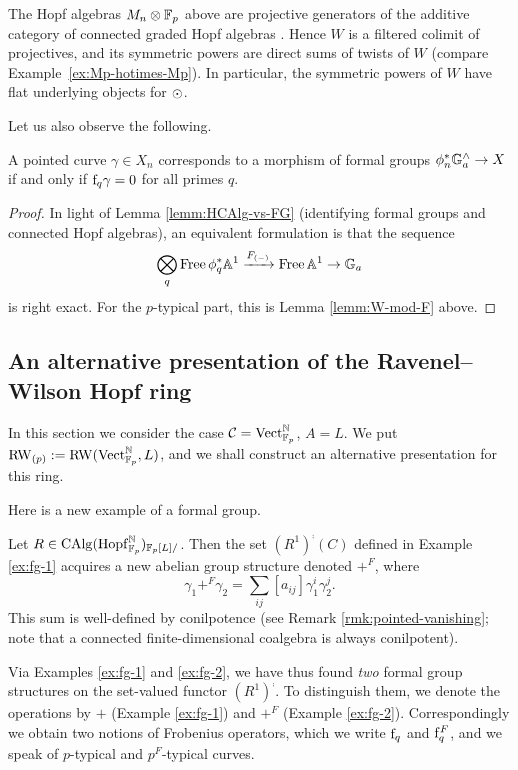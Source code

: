 \begin{remark}\label{app:rw-projective}
The Hopf algebras $M_n\otimes \mathbb{F}_p$ above are projective generators of the additive category of connected graded Hopf algebras \cite{goerss-dieudonne,MR281709}. Hence $W$ is a filtered colimit of projectives, and its symmetric powers are direct sums of twists of $W$ (compare Example~\ref{ex:Mp-hotimes-Mp}). In particular, the symmetric powers of $W$ have flat underlying objects for $\odot$.
\end{remark}
Let us also observe the following.
\begin{lemma} \label{lemm:additive-curves-frob}
A pointed curve $\gamma \in X_n$ corresponds to a morphism of formal groups $\phi_n^* {\mathbb G}_a^\wedge \to X$ if and only if $\mathrm f_q \gamma = 0$ for all primes $q$.
\end{lemma}
\begin{proof}
In light of Lemma \ref{lemm:HCAlg-vs-FG} (identifying formal groups and connected Hopf algebras), an equivalent formulation is that the sequence \[ \bigotimes_q \operatorname{Free} \phi_q^* \mathbb A^1 \xrightarrow{F_{(\mathord-)}} \operatorname{Free}\mathbb A^1 \to {\mathbb G}_a \] is right exact.
For the $p$-typical part, this is Lemma \ref{lemm:W-mod-F} above.
\end{proof}


\subsection{An alternative presentation of the Ravenel--Wilson Hopf ring}\label{subsec:RW-p}
In this section we consider the case $\mathcal C = \mathrm{Vect}_{\mathbb{F}_p}^{\mathbb{N}}$, $A = L$.
We put $\mathrm{RW}_{(p)} := \mathrm{RW}(\mathrm{Vect}_{\mathbb{F}_p}^{\mathbb{N}}, L)$, and we shall construct an alternative presentation for this ring.

Here is a new example of a formal group.
\begin{example}\label{ex:fg-2}
Let $R \in \mathrm{CAlg}(\mathrm{Hopf}_{\mathbb{F}_p}^{\mathbb{N}})_{\mathbb{F}_p[L]/}$.
Then the set $(R^1)^\comp(C)$ defined in Example \ref{ex:fg-1} acquires a new abelian group structure denoted $+^F$, where \[ \gamma_1 +^F \gamma_2 = \sum_{ij} [a_{ij}] \gamma_1^i \gamma_2^j. \]
This sum is well-defined by conilpotence (see Remark \ref{rmk:pointed-vanishing}; note that a connected finite-dimensional coalgebra is always conilpotent).
\end{example}
Via Examples \ref{ex:fg-1} and \ref{ex:fg-2}, we have thus found \emph{two} formal group structures on the set-valued functor $(R^1)^\comp$.
To distinguish them, we denote the operations by $+$ (Example \ref{ex:fg-1}) and $+^F$ (Example \ref{ex:fg-2}).
Correspondingly we obtain two notions of Frobenius operators, which we write $\mathrm f_q$ and $\mathrm f_q^F$, and we speak of $p$-typical and $p^F$-typical curves.

